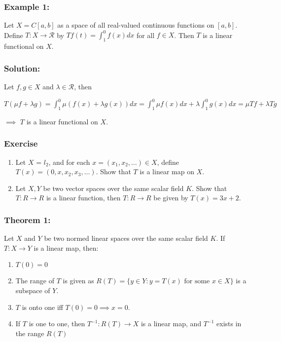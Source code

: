 \documentclass[12pt]{article}
\begin{document}
\subsubsection*{Example 1:}
Let $X = C[a,b]$ as a space of all real-valued continuous functions on $[a,b]$. Define $T: X \to \mathcal{R}$ by
\begin{math}
    Tf(t) = \int_{1}^{0} f(x) dx
\end{math}
for all $f \in X$. Then $T$ is a linear functional on $X$.

\subsubsection*{Solution:}
Let $f, g \in X$ and $\lambda \in \mathcal{R}$, then

\begin{math}
    T(\mu f + \lambda g) = \int_{1}^{0}\mu (f(x) + \lambda g(x)) dx = \int_{1}^{0} \mu f(x) dx + \lambda \int_{1}^{0} g(x) dx = \mu Tf + \lambda Tg
\end{math}

$\implies$ $T$ is a linear functional on $X$.

\subsubsection*{Exercise}
\begin{enumerate}
    \item Let $X$ = $\mathit{l}_2$, and for each $x = (x_1, x_2, \dots) \in X$, define $T(x) = (0,x,x_2, x_3, \dots)$. Show that $T$ is a linear map on $X$.
    \item Let $X,Y$ be two vector spaces over the same scalar field $K$. Show that $T: R \to R$ is a linear function, then $T: R \to R$ be given by $T(x) = 3x + 2$.
\end{enumerate}

\subsubsection*{Theorem 1:}
Let $X$ and $Y$ be two normed linear spaces over the same scalar field $K$. If $T: X \to Y$ is a linear map, then:

\begin{enumerate}
    \item $T(0) = 0$
    \item The range of $T$ is given as $R(T) = \{y \in Y: y = T(x) \text{ for some } x \in X\}$ is a subspace of $Y$.
    \item $T$ is onto one iff $T(0) = 0 \implies x = 0$.
    \item If $T$ is one to one, then $T^{-1}: R(T) \to X$ is a linear map, and $T^{-1}$ exists in the range $R(T)$
\end{enumerate}
\end{document}
